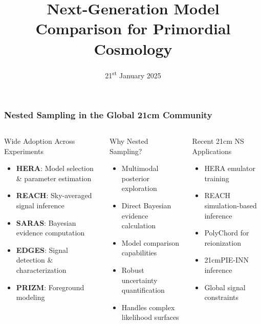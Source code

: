 \documentclass[aspectratio=169]{beamer}
\title{Next-Generation Model Comparison for Primordial Cosmology}
\date{21\textsuperscript{st} January 2025}
\begin{document}
\begin{frame}
    \titlepage
\end{frame}

\begin{frame}
    \frametitle{Nested Sampling in the Global 21cm Community}
    \begin{columns}
        \begin{block}{Wide Adoption Across Experiments}
            \begin{itemize}
                \item \textbf{HERA}: Model selection \& parameter estimation
                \item \textbf{REACH}: Sky-averaged signal inference
                \item \textbf{SARAS}: Bayesian evidence computation
                \item \textbf{EDGES}: Signal detection \& characterization
                \item \textbf{PRIZM}: Foreground modeling
            \end{itemize}
        \end{block}
        \begin{block}{Why Nested Sampling?}
            \begin{itemize}
                \item Multimodal posterior exploration
                \item Direct Bayesian evidence calculation
                \item Model comparison capabilities
                \item Robust uncertainty quantification
                \item Handles complex likelihood surfaces
            \end{itemize}
        \end{block}
        \begin{block}{Recent 21cm NS Applications}
            \begin{itemize}
                \item HERA emulator training 
                \item REACH simulation-based inference 
                \item PolyChord for reionization 
                \item 21cmPIE-INN inference 
                \item Global signal constraints 

\end{itemize}
\end{block}
\end{columns}
\end{frame}
\end{document}
